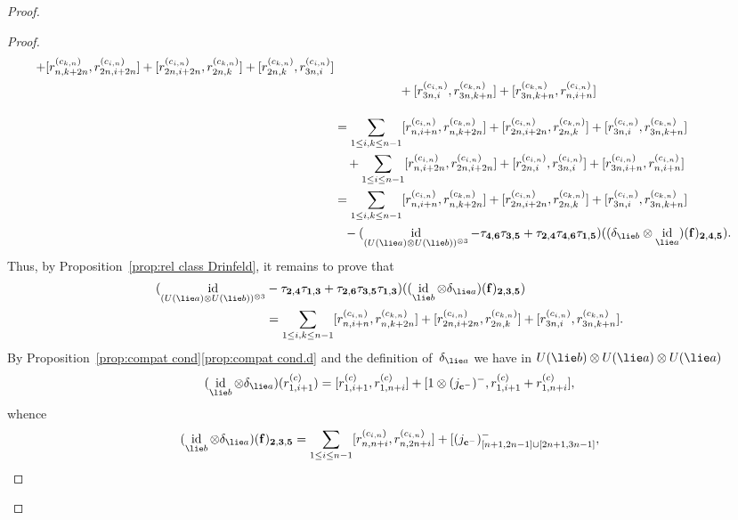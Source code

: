 \documentclass[12pt, reqno]{amsart}
\theoremstyle{definition}
\numberwithin{equation}{section}
\newcommand{\tensor}{\otimes}
\DeclareMathOperator{\id}{id}
\begin{document}
\begin{proof}
\begin{proof}
\begin{align*}
+[r_{n,k+2n}^{(c_{k,n})},r_{2n,i+2n}^{(c_{i,n})}]
+[r_{2n,i+2n}^{(c_{i,n})},r_{2n,k}^{(c_{k,n})}]
+[r_{2n,k}^{(c_{k,n})},r_{3n,i}^{(c_{i,n})}]\\
&\phantom{=\sum_{1\le i,k\le n-1}}+[r_{3n,i}^{(c_{i,n})},
r_{3n,k+n}^{(c_{k,n})}]+[r_{3n,k+n}^{(c_{k,n})},r_{n,i+n}^{(c_{i,n})}]\\
&=\sum_{1\le i,k\le n-1} [r_{n,i+n}^{(c_{i,n})},r_{n,k+2n}^{(c_{k,n})}]+[r_{2n,i+2n}^{(c_{i,n})},r_{2n,k}^{(c_{k,n})}]+[r_{3n,i}^{(c_{i,n})},
r_{3n,k+n}^{(c_{k,n})}]\\
&\quad +\sum_{1\le i\le n-1}[r_{n,i+2n}^{(c_{i,n})},r_{2n,i+2n}^{(c_{i,n})}]
+[r_{2n,i}^{(c_{i,n})},r_{3n,i}^{(c_{i,n})}]+[r_{3n,i+n}^{(c_{i,n})},r_{n,i+n}^{(c_{i,n})}]
\\
&=\sum_{1\le i,k\le n-1} [r_{n,i+n}^{(c_{i,n})},r_{n,k+2n}^{(c_{k,n})}]+[r_{2n,i+2n}^{(c_{i,n})},r_{2n,k}^{(c_{k,n})}]+[r_{3n,i}^{(c_{i,n})},
r_{3n,k+n}^{(c_{k,n})}]
\\
&\phantom{=}-(\id_{(U(\lie a)\tensor U(\lie b))^{\tensor3}}-\tau_{\mathbf 4,\mathbf 6}\tau_{\mathbf 3,\mathbf 5}+\tau_{\mathbf 2,\mathbf 4}\tau_{\mathbf 4,\mathbf 6}\tau_{\mathbf 1,\mathbf 5})((\delta_{\lie b}\tensor \id_{\lie a})(\mathbf f)_{\mathbf 2,\mathbf 4,\mathbf 5}).
\end{align*}
Thus, by Proposition~\ref{prop:rel class Drinfeld}, it remains to prove that 
\begin{align}
(\id_{(U(\lie a)\tensor U(\lie b))^{\tensor3}}&-\tau_{\mathbf 2,\mathbf 4}\tau_{\mathbf 1,\mathbf 3}+\tau_{\mathbf 2,\mathbf 6}\tau_{\mathbf 3,\mathbf 5}\tau_{\mathbf 1,\mathbf 3})((\id_{\lie b}\tensor \delta_{\lie a})(\mathbf f)_{\mathbf 2,\mathbf 3,\mathbf 5})\nonumber\\
&=\sum_{1\le i,k\le n-1} [r_{n,i+n}^{(c_{i,n})},r_{n,k+2n}^{(c_{k,n})}]+[r_{2n,i+2n}^{(c_{i,n})},r_{2n,k}^{(c_{k,n})}]+[r_{3n,i}^{(c_{i,n})},
r_{3n,k+n}^{(c_{k,n})}].\label{eq:jc rel equiv}
\end{align}
By Proposition~\ref{prop:compat cond}\ref{prop:compat cond.d} and the definition of~$\delta_{\lie a}$ we have in $U(\lie b)\tensor U(\lie a)\tensor U(\lie a)$
\begin{align*}
(\id_{\lie b}\tensor\delta_{\lie a})(r_{1,i+1}^{(c)})=
[r_{1,i+1}^{(c)},r_{1,n+i}^{(c)}]+[1\tensor (j_{\mathbf c^-})^-,r_{1,i+1}^{(c)}+r_{1,n+i}^{(c)}],
\end{align*}
whence 
$$
(\id_{\lie b}\tensor\delta_{\lie a})(\mathbf f)_{\mathbf 2,\mathbf 3,\mathbf 5}
=\sum_{1\le i\le n-1} [r_{n,n+i}^{(c_{i,n})},r_{n,2n+i}^{(c_{i,n})}]
+[( j_{\mathbf c^-})^-_{[n+1,2n-1]\cup[2n+1,3n-1]},
$$
\end{proof}
\end{proof}
\end{document}
